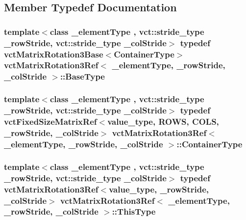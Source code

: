 \subsection{Member Typedef Documentation}
\hypertarget{classvct_matrix_rotation3_ref_a6710fec4e5d3c1a4f8f376293b1f30dd}{
\subsubsection[{Base\-Type}]{\setlength{\rightskip}{0pt plus 5cm}template$<$class \-\_\-element\-Type , vct\-::stride\-\_\-type \-\_\-row\-Stride, vct\-::stride\-\_\-type \-\_\-col\-Stride$>$ typedef {\bf vct\-Matrix\-Rotation3\-Base}$<${\bf Container\-Type}$>$ {\bf vct\-Matrix\-Rotation3\-Ref}$<$ \-\_\-element\-Type, \-\_\-row\-Stride, \-\_\-col\-Stride $>$\-::{\bf Base\-Type}}}\label{classvct_matrix_rotation3_ref_a6710fec4e5d3c1a4f8f376293b1f30dd}
\hypertarget{classvct_matrix_rotation3_ref_acf072a6c67950bf0621787114bb016b4}{
\subsubsection[{Container\-Type}]{\setlength{\rightskip}{0pt plus 5cm}template$<$class \-\_\-element\-Type , vct\-::stride\-\_\-type \-\_\-row\-Stride, vct\-::stride\-\_\-type \-\_\-col\-Stride$>$ typedef {\bf vct\-Fixed\-Size\-Matrix\-Ref}$<$value\-\_\-type, {\bf R\-O\-W\-S}, {\bf C\-O\-L\-S}, \-\_\-row\-Stride, \-\_\-col\-Stride$>$ {\bf vct\-Matrix\-Rotation3\-Ref}$<$ \-\_\-element\-Type, \-\_\-row\-Stride, \-\_\-col\-Stride $>$\-::{\bf Container\-Type}}}\label{classvct_matrix_rotation3_ref_acf072a6c67950bf0621787114bb016b4}
\hypertarget{classvct_matrix_rotation3_ref_aa4f99a97ebf5b94d4030335f45c91966}{
\subsubsection[{This\-Type}]{\setlength{\rightskip}{0pt plus 5cm}template$<$class \-\_\-element\-Type , vct\-::stride\-\_\-type \-\_\-row\-Stride, vct\-::stride\-\_\-type \-\_\-col\-Stride$>$ typedef {\bf vct\-Matrix\-Rotation3\-Ref}$<$value\-\_\-type, \-\_\-row\-Stride, \-\_\-col\-Stride$>$ {\bf vct\-Matrix\-Rotation3\-Ref}$<$ \-\_\-element\-Type, \-\_\-row\-Stride, \-\_\-col\-Stride $>$\-::{\bf This\-Type}}}\label{classvct_matrix_rotation3_ref_aa4f99a97ebf5b94d4030335f45c91966}
